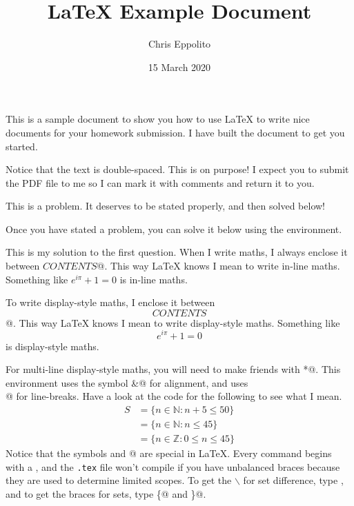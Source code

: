\documentclass[12pt, answers]{exam}
\title{\LaTeX{} Example Document}  %
\author{Chris Eppolito}            %
\date{15 March 2020}               %
\begin{document}
\maketitle     %
\doublespacing %

This is a sample document to show you how to use \LaTeX{} to write nice documents for your homework submission.  I have built the document to get you started.

Notice that the text is double-spaced.  This is on purpose!  I expect you to submit the PDF file to me so I can mark it with comments and return it to you.

\begin{questions}

\question This is a problem.  It deserves to be stated properly, and then solved below!

Once you have stated a problem, you can solve it below using the \verb@solution@ environment.

\begin{solution}
This is my solution to the first question.  When I write maths, I always enclose it between \verb@\( CONTENTS \)@.  This way \LaTeX{} knows I mean to write in-line maths.  Something like \(e^{i\pi} + 1 = 0\) is in-line maths.

To write display-style maths, I enclose it between \verb@\[ CONTENTS \]@.  This way \LaTeX{} knows I mean to write display-style maths.  Something like \[e^{i\pi} + 1 = 0\] is display-style maths.

For multi-line display-style maths, you will need to make friends with \verb@align*@.  This environment uses the symbol \verb@&@ for alignment, and uses \verb@\\@ for line-breaks.  Have a look at the code for the following to see what I mean.
\begin{align*}
    S &= \{n \in \mathbb{N} : n + 5 \leq 50\} \\
    &= \{n \in \mathbb{N} : n \leq 45\} \\
    &= \{n \in \mathbb{Z} : 0 \leq n \leq 45\}
\end{align*}
Notice that the symbols \verb@\@ and @ are special in \LaTeX{}.  Every command begins with a \verb@\@, and the \texttt{.tex} file won't compile if you have unbalanced braces because they are used to determine limited scopes.  To get the \(\backslash\) for set difference, type \verb@\setminus@, and to get the braces for sets, type \verb@\{@ and \verb@\}@.


\end{solution}
\end{questions}
\end{document}
